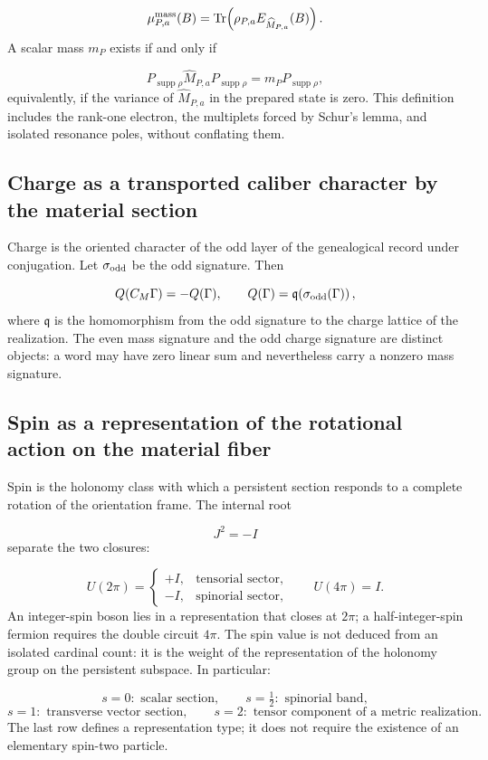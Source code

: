 \[
 \mu_{P,a}^{\rm mass}(B)
 =\operatorname{Tr}\!\left(
 \rho_{P,a}E_{\widehat M_{P,a}}(B)\right).
\]
A scalar mass \(m_P\) exists if and only if

\[
 P_{\operatorname{supp}\rho}\widehat M_{P,a}
 P_{\operatorname{supp}\rho}
 =m_P P_{\operatorname{supp}\rho},
\]
equivalently, if the variance of \(\widehat M_{P,a}\) in the prepared state is zero. This definition includes the rank-one electron, the multiplets forced by Schur's lemma, and isolated resonance poles, without conflating them.

\subsection{Charge as a transported caliber character by the material section}
Charge is the oriented character of the odd layer of the genealogical record under conjugation. Let \(\sigma_{\rm odd}\) be the odd signature. Then

\[
 Q(C_M\Gamma)=-Q(\Gamma),\qquad
 Q(\Gamma)=\mathfrak q\!\left(\sigma_{\rm odd}(\Gamma)\right),
\]
where \(\mathfrak q\) is the homomorphism from the odd signature to the charge lattice of the realization. The even mass signature and the odd charge signature are distinct objects: a word may have zero linear sum and nevertheless carry a nonzero mass signature.

\subsection{Spin as a representation of the rotational action on the material fiber}
Spin is the holonomy class with which a persistent section responds to a complete rotation of the orientation frame. The internal root

\[
 J^2=-I
\]
separate the two closures:

\[
 U(2\pi)=
 \begin{cases}
 +I,&\text{tensorial sector},\\
 -I,&\text{spinorial sector},
 \end{cases}
 \qquad
 U(4\pi)=I.
\]
An integer-spin boson lies in a representation that closes at \(2\pi\); a half-integer-spin fermion requires the double circuit \(4\pi\). The spin value is not deduced from an isolated cardinal count: it is the weight of the representation of the holonomy group on the persistent subspace. In particular:

\[
 s=0:\text{ scalar section},\qquad
 s=\tfrac12:\text{ spinorial band},
\]
\[
 s=1:\text{ transverse vector section},\qquad
 s=2:\text{ tensor component of a metric realization}.
\]
The last row defines a representation type; it does not require the existence of an elementary spin-two particle.

